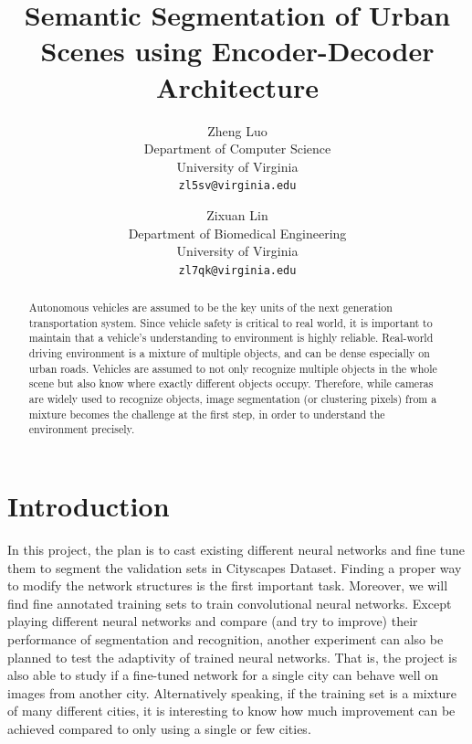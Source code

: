 \documentclass[10pt,twocolumn,letterpaper]{article}
\begin{document}
\title{Semantic Segmentation of Urban Scenes using Encoder-Decoder Architecture}

\author{Zheng Luo\\
Department of Computer Science\\
University of Virginia\\
{\tt\small zl5sv@virginia.edu}
\and
Zixuan Lin\\
Department of Biomedical Engineering\\
University of Virginia\\
{\tt\small zl7qk@virginia.edu}
}

\maketitle

\begin{abstract}
   Autonomous vehicles are assumed to be the key units of the next generation transportation system. Since vehicle safety is critical to real world, it is important to maintain that a vehicle’s understanding to environment is highly reliable. Real-world driving environment is a mixture of multiple objects, and can be dense especially on urban roads. Vehicles are assumed to not only recognize multiple objects in the whole scene but also know where exactly different objects occupy. Therefore, while cameras are widely used to recognize objects, image segmentation (or clustering pixels) from a mixture becomes the challenge at the first step, in order to understand the environment precisely.
\end{abstract}




\section{Introduction}

In this project, the plan is to cast existing different neural networks and fine tune them to segment the validation sets in Cityscapes Dataset. Finding a proper way to modify the network structures is the first important task. Moreover, we will find fine annotated training sets to train convolutional neural networks. Except playing different neural networks and compare (and try to improve) their performance of segmentation and recognition, another experiment can also be planned to test the adaptivity of trained neural networks. That is, the project is also able to study if a fine-tuned network for a single city can behave well on images from another city. Alternatively speaking, if the training set is a mixture of many different cities, it is interesting to know how much improvement can be achieved compared to only using a single or few cities.
\end{document}

